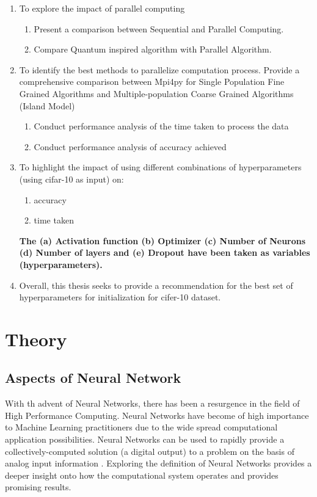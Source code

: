 \begin{enumerate}
	\item To explore the impact of parallel computing
	\begin{enumerate}
		\item Present a comparison between Sequential and Parallel Computing.
		\item Compare Quantum inspired algorithm with Parallel Algorithm.
	\end{enumerate}
	\item To identify the best methods to parallelize computation process. Provide a comprehensive comparison between Mpi4py for 
	Single Population Fine Grained Algorithms and
	Multiple-population Coarse Grained Algorithms (Island Model)
	\begin{enumerate}
		\item Conduct performance analysis of the time taken to process the data
		\item Conduct performance analysis of accuracy achieved
	\end{enumerate}
	\item To highlight the impact of using different combinations of hyperparameters (using cifar-10 as input) on: 
	\begin{enumerate}
		\item accuracy
		\item time taken
	\end{enumerate}
	\textbf{The (a) Activation function (b) Optimizer (c) Number of Neurons (d) Number of layers and (e) Dropout have been taken as variables (hyperparameters).} 
	\item Overall, this thesis seeks to provide a recommendation for the best set of hyperparameters for initialization for cifer-10 dataset. 
\end{enumerate}


\section{Theory}

\subsection{Aspects of Neural Network}
With th advent of Neural Networks, there has been a resurgence in the field of High Performance Computing\cite{lippmann1987introduction}. Neural Networks have become of high importance to Machine Learning practitioners due to the wide spread computational application possibilities. Neural Networks can be used to rapidly provide a collectively-computed solution (a digital output) to a problem on the basis of analog input information \cite{hopfield1985neural}. Exploring the definition of Neural Networks provides a deeper insight onto how the computational system operates and provides promising results.

